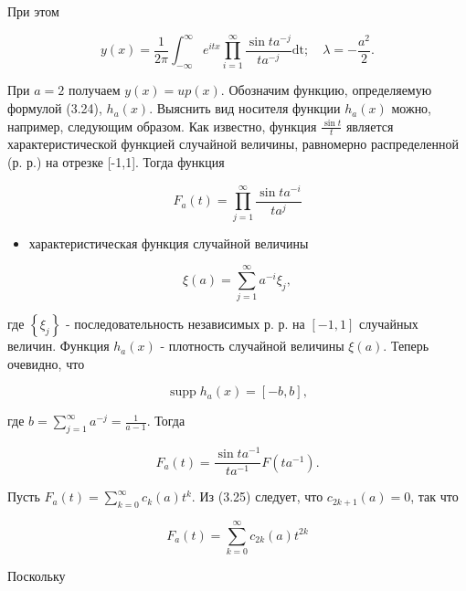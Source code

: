 \documentclass[10pt]{article}
\begin{document}
При этом


\begin{equation*}
y(x)=\frac{1}{2 \pi} \int_{-\infty}^{\infty} e^{i t x} \prod_{i=1}^{\infty} \frac{\sin t a^{-j}}{t a^{-j}} \mathrm{dt} ; \quad \lambda=-\frac{a^{2}}{2} . \tag{3.24}
\end{equation*}


При $a=2$ получаем $y(x)=u p(x)$. Обозначим функцию, определяемую формулой (3.24), $h_{a}(x)$. Выяснить вид носителя функции $h_{a}(x)$ можно, например, следующим образом. Как известно, функция $\frac{\sin t}{t}$ является характеристической функцией случайной величины, равномерно распределенной (р. р.) на отрезке [-1,1]. Тогда функция


\begin{equation*}
F_{a}(t)=\prod_{j=1}^{\infty} \frac{\sin t a^{-i}}{t a^{j}} \tag{3.25}
\end{equation*}


\begin{itemize}
  \item характеристическая функция случайной величины
\end{itemize}


\begin{equation*}
\xi(a)=\sum_{j=1}^{\infty} a^{-i} \xi_{j}, \tag{3.26}
\end{equation*}


где $\left\{\xi_{j}\right\}$ - последовательность независимых р. р. на $[-1,1]$ случайных величин. Функция $h_{a}(x)$ - плотность случайной величины $\xi(a)$. Теперь очевидно, что


\begin{equation*}
\operatorname{supp} h_{a}(x)=[-b, b], \tag{3.27}
\end{equation*}


где $b=\sum_{j=1}^{\infty} a^{-j}=\frac{1}{a-1}$. Тогда


\begin{equation*}
F_{a}(t)=\frac{\sin t a^{-1}}{t a^{-1}} F\left(t a^{-1}\right) . \tag{3.28}
\end{equation*}


Пусть $F_{a}(t)=\sum_{k=0}^{\infty} c_{k}(a) t^{k}$. Из (3.25) следует, что $c_{2 k+1}(a)=0$, так что


\begin{equation*}
F_{a}(t)=\sum_{k=0}^{\infty} c_{2 k}(a) t^{2 k} \tag{3.29}
\end{equation*}


Поскольку
\end{document}
